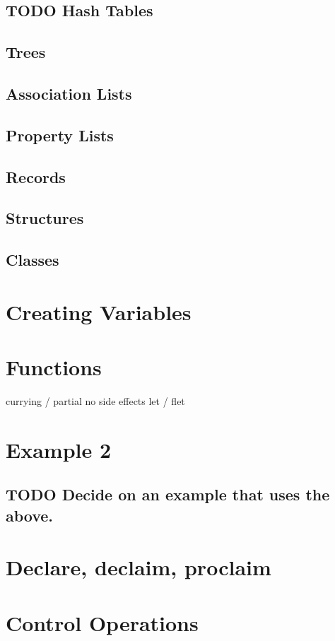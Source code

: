 \documentclass[11pt]{article}
\begin{document}
\subsection{{\bfseries\sffamily TODO} Hash Tables}
\label{sec-5-3}
\subsection{Trees}
\label{sec-5-4}
\subsection{Association Lists}
\label{sec-5-5}
\subsection{Property Lists}
\label{sec-5-6}
\subsection{Records}
\label{sec-5-7}
\subsection{Structures}
\label{sec-5-8}
\subsection{Classes}
\label{sec-5-9}
\section{Creating Variables}
\label{sec-6}
\section{Functions}
\label{sec-7}
currying / partial
no side effects
let / flet 
\section{Example 2}
\label{sec-8}
\subsection{{\bfseries\sffamily TODO} Decide on an example that uses the above.}
\label{sec-8-1}
\section{Declare, declaim, proclaim}
\label{sec-9}
\section{Control Operations}
\label{sec-10}
\end{document}
